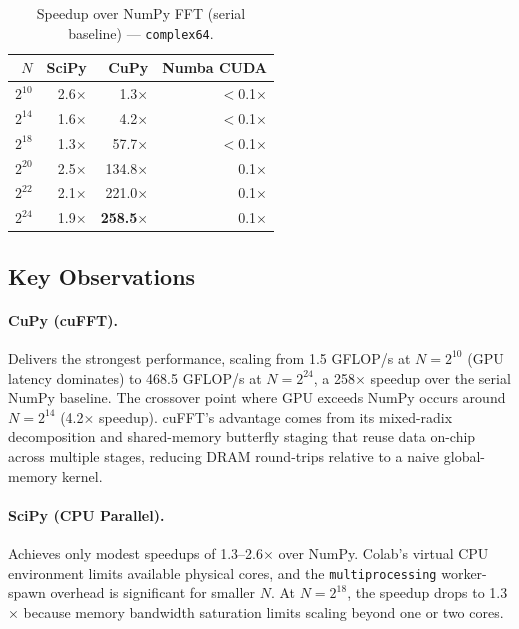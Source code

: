 \documentclass[12pt, letterpaper]{article}
\begin{document}
\begin{table}[H]
\centering
\caption{Speedup over NumPy FFT (serial baseline) --- \texttt{complex64}.}
\begin{tabular}{@{}rrrr@{}}
\toprule
$N$ & \textbf{SciPy} & \textbf{CuPy} & \textbf{Numba CUDA} \\
\midrule
$2^{10}$  & 2.6$\times$  & 1.3$\times$   & $<$0.1$\times$ \\
$2^{14}$  & 1.6$\times$  & 4.2$\times$   & $<$0.1$\times$ \\
$2^{18}$  & 1.3$\times$  & 57.7$\times$  & $<$0.1$\times$ \\
$2^{20}$  & 2.5$\times$  & 134.8$\times$ & 0.1$\times$ \\
$2^{22}$  & 2.1$\times$  & 221.0$\times$ & 0.1$\times$ \\
$2^{24}$  & 1.9$\times$  & \textbf{258.5$\times$} & 0.1$\times$ \\
\bottomrule
\end{tabular}
\label{tab:speedup}
\end{table}

\subsection{Key Observations}

\paragraph{CuPy (cuFFT).} Delivers the strongest performance, scaling from 1.5 GFLOP/s at $N = 2^{10}$ (GPU latency dominates) to 468.5 GFLOP/s at $N = 2^{24}$, a 258$\times$ speedup over the serial NumPy baseline. The crossover point where GPU exceeds NumPy occurs around $N = 2^{14}$ (4.2$\times$ speedup). cuFFT's advantage comes from its mixed-radix decomposition and shared-memory butterfly staging that reuse data on-chip across multiple stages, reducing DRAM round-trips relative to a naive global-memory kernel.

\paragraph{SciPy (CPU Parallel).} Achieves only modest speedups of 1.3--2.6$\times$ over NumPy. Colab's virtual CPU environment limits available physical cores, and the \texttt{multiprocessing} worker-spawn overhead is significant for smaller $N$. At $N = 2^{18}$, the speedup drops to 1.3$\times$ because memory bandwidth saturation limits scaling beyond one or two cores.
\end{document}
